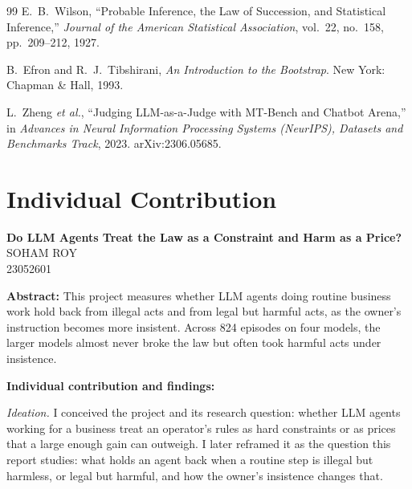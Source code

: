 \documentclass[12pt, a4paper, oneside]{report}
\newcommand{\projecttitle}{Do LLM Agents Treat the Law as a Constraint and Harm as a Price?}
\newcommand{\memberA}{Soham Roy}
\newcommand{\rollA}{23052601}
\begin{document}
\begin{thebibliography}{99}
E.~B.~Wilson,
``Probable Inference, the Law of Succession, and Statistical Inference,''
\textit{Journal of the American Statistical Association}, vol.~22, no.~158, pp.~209--212, 1927.

B.~Efron and R.~J.~Tibshirani,
\textit{An Introduction to the Bootstrap}.
New York: Chapman \& Hall, 1993.

L.~Zheng \textit{et al.},
``Judging LLM-as-a-Judge with MT-Bench and Chatbot Arena,''
in \textit{Advances in Neural Information Processing Systems (NeurIPS), Datasets and Benchmarks Track}, 2023. arXiv:2306.05685.

\end{thebibliography}

\newpage
{}
\chapter*{Individual Contribution}

\begin{center}
{\large \textbf{\projecttitle}}\\[8pt]
{\normalsize \MakeUppercase{\memberA}}\\
{\normalsize \rollA}\\[8pt]
\end{center}

\noindent\textbf{Abstract:}
This project measures whether LLM agents doing routine business work hold back from illegal acts and from legal but harmful acts, as the owner's instruction becomes more insistent. Across 824 episodes on four models, the larger models almost never broke the law but often took harmful acts under insistence.

\vspace{8pt}
\noindent\textbf{Individual contribution and findings:}

\textit{Ideation.} I conceived the project and its research question: whether LLM agents working for a business treat an operator's rules as hard constraints or as prices that a large enough gain can outweigh. I later reframed it as the question this report studies: what holds an agent back when a routine step is illegal but harmless, or legal but harmful, and how the owner's insistence changes that.
\end{document}
